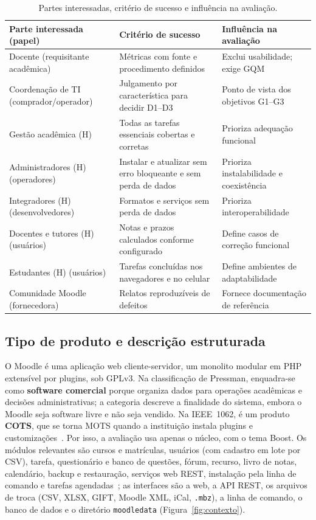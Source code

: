 \documentclass[12pt]{article}
\newcommand{\tabfonte}[1]{\par\vspace{2pt}{\footnotesize Fonte: #1}}
\begin{document}
\begin{table}[!ht]
\centering
\caption{Partes interessadas, critério de sucesso e influência na avaliação.}
\label{tab:stakeholders}
\scriptsize
\begin{tabularx}{\linewidth}{p{3.1cm}LL}
\toprule
\textbf{Parte interessada (papel)} & \textbf{Critério de sucesso} & \textbf{Influência na avaliação} \\
\midrule
Docente (requisitante acadêmica) & Métricas com fonte e procedimento definidos & Exclui usabilidade; exige GQM \\
Coordenação de TI (comprador/operador) & Julgamento por característica para decidir D1--D3 & Ponto de vista dos objetivos G1--G3 \\
Gestão acadêmica (H) & Todas as tarefas essenciais cobertas e corretas & Prioriza adequação funcional \\
Administradores (H) (operadores) & Instalar e atualizar sem erro bloqueante e sem perda de dados & Prioriza instalabilidade e coexistência \\
Integradores (H) (desenvolvedores) & Formatos e serviços sem perda de dados & Prioriza interoperabilidade \\
Docentes e tutores (H) (usuários) & Notas e prazos calculados conforme configurado & Define casos de correção funcional \\
Estudantes (H) (usuários) & Tarefas concluídas nos navegadores e no celular & Define ambientes de adaptabilidade \\
Comunidade Moodle (fornecedora) & Relatos reproduzíveis de defeitos & Fornece documentação de referência \\
\bottomrule
\end{tabularx}
\tabfonte{elaboração própria. (H): necessidade hipotética, ainda não validada.}
\end{table}

\subsection{Tipo de produto e descrição estruturada}

O Moodle é uma aplicação web cliente-servidor, um monolito modular em PHP extensível por plugins, sob GPLv3. Na classificação de Pressman, enquadra-se como \textbf{software comercial} porque organiza dados para operações acadêmicas e decisões administrativas; a categoria descreve a finalidade do sistema, embora o Moodle seja software livre e não seja vendido. Na IEEE~1062, é um produto \textbf{COTS}, que se torna MOTS quando a instituição instala plugins e customizações~\cite{pressman2002,ieee1062}. Por isso, a avaliação usa apenas o núcleo, com o tema Boost. Os módulos relevantes são cursos e matrículas, usuários (com cadastro em lote por CSV), tarefa, questionário e banco de questões, fórum, recurso, livro de notas, calendário, backup e restauração, serviços web REST, instalação pela linha de comando e tarefas agendadas~\cite{hunt2012moodle}; as interfaces são a web, a API REST, os arquivos de troca (CSV, XLSX, GIFT, Moodle XML, iCal, \texttt{.mbz}), a linha de comando, o banco de dados e o diretório \texttt{moodledata} (Figura~\ref{fig:contexto}).
\end{document}
